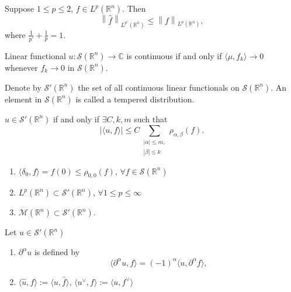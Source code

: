 \begin{proposition}\label{prop:1.5}
Suppose $1\leq p\leq 2$, $f \in L^{p}(\mathbb{R}^{n})$. Then
$$
\left\| \hat{f} \right\| _{L^{p'}(\mathbb{R}^{n})}\leq \left\| f \right\| _{L^{p}(\mathbb{R}^{n})},
$$
where $\frac{1}{p'}+\frac{1}{p}=1$.
\end{proposition}

Linear functional $u:\mathscr{S}(\mathbb{R}^{n})\to \mathbb{C}$ is continuous if and only if $\langle\mu,f_{k}\rangle\to 0$ whenever $f_{k}\to 0$ in $\mathscr{S}(\mathbb{R}^{n})$.

Denote by $\mathscr{S}'(\mathbb{R}^{n})$ the set of all continuous linear functionals on $\mathscr{S}(\mathbb{R}^{n})$. 
An element in $\mathscr{S}(\mathbb{R}^{n})$ is called a tempered distribution.

\begin{proposition}\label{prop:1.6}
$u \in \mathscr{S}'(\mathbb{R}^{n})$ if and only if $\exists C,k,m$ such that
$$
|\langle u,f\rangle| \leq C \sum_{\substack{|\alpha| \leq m,\\|\beta| \leq k}}\rho_{\alpha,\beta}(f).
$$
\end{proposition}

\begin{example}\label{ex:distributions}
\begin{enumerate}[label=(\roman*)]
    \item $\langle \delta_{0},f\rangle=f(0)\leq \rho _{0,0}(f)$, $\forall f \in \mathscr{S}(\mathbb{R}^{n})$
    \item $L^{p}(\mathbb{R}^{n})\subset \mathscr{S}'(\mathbb{R}^{n})$, $\forall 1\leq p\leq \infty$
    \item $\mathcal{M}(\mathbb{R}^{n})\subset \mathscr{S}'(\mathbb{R}^{n})$.
\end{enumerate}
\end{example}

\begin{definition}\label{def:distribution_operations}
Let $u \in \mathscr{S}'(\mathbb{R}^{n})$
\begin{enumerate}[label=(\roman*)]
    \item $\partial ^{\alpha}u$ is defined by $$\langle \partial ^{\alpha}u,f\rangle=(-1)^{\alpha}\langle u,\partial ^{\alpha}f\rangle,$$
    \item $\langle \hat{u},f\rangle:= \langle u,\hat{f}\rangle$,
   $\langle u^{\vee},f\rangle:=\langle u,f^{\vee}\rangle$
\end{enumerate}
\end{definition}


